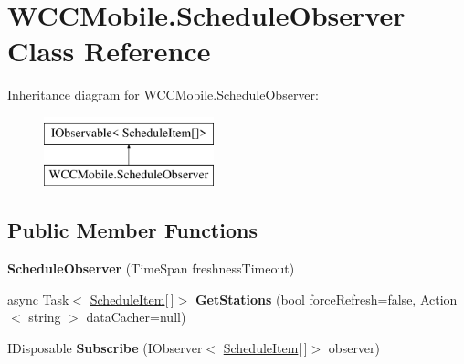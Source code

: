 \hypertarget{class_w_c_c_mobile_1_1_schedule_observer}{}\section{W\+C\+C\+Mobile.\+Schedule\+Observer Class Reference}
\label{class_w_c_c_mobile_1_1_schedule_observer}
Inheritance diagram for W\+C\+C\+Mobile.\+Schedule\+Observer\+:\begin{figure}[H]
\begin{center}
\leavevmode
\includegraphics[height=2.000000cm]{class_w_c_c_mobile_1_1_schedule_observer}
\end{center}
\end{figure}
\subsection*{Public Member Functions}
\begin{DoxyCompactItemize}
\item 
{\bfseries Schedule\+Observer} (Time\+Span freshness\+Timeout)\hypertarget{class_w_c_c_mobile_1_1_schedule_observer_aa2671067f6f4e653c53bbd18d30ef138}{}\label{class_w_c_c_mobile_1_1_schedule_observer_aa2671067f6f4e653c53bbd18d30ef138}

\item 
async Task$<$ \hyperlink{class_w_c_c_mobile_1_1_models_1_1_schedule_item}{Schedule\+Item}\mbox{[}$\,$\mbox{]}$>$ {\bfseries Get\+Stations} (bool force\+Refresh=false, Action$<$ string $>$ data\+Cacher=null)\hypertarget{class_w_c_c_mobile_1_1_schedule_observer_a188eb1decb6645152cc60c818b660109}{}\label{class_w_c_c_mobile_1_1_schedule_observer_a188eb1decb6645152cc60c818b660109}

\item 
I\+Disposable {\bfseries Subscribe} (I\+Observer$<$ \hyperlink{class_w_c_c_mobile_1_1_models_1_1_schedule_item}{Schedule\+Item}\mbox{[}$\,$\mbox{]}$>$ observer)\hypertarget{class_w_c_c_mobile_1_1_schedule_observer_a65071c6f65680de277f70531e2719d25}{}\label{class_w_c_c_mobile_1_1_schedule_observer_a65071c6f65680de277f70531e2719d25}

\end{DoxyCompactItemize}
